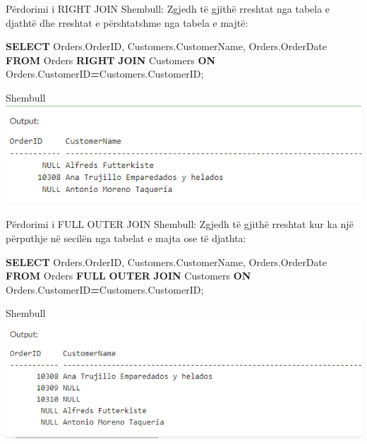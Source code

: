 \documentclass[
  ignorenonframetext,
]{beamer}
\newenvironment{Shaded}{\begin{snugshade}}{\end{snugshade}}
\newcommand{\KeywordTok}[1]{\textcolor[rgb]{0.13,0.29,0.53}{\textbf{#1}}}
\newcommand{\NormalTok}[1]{#1}
\newcommand{\OperatorTok}[1]{\textcolor[rgb]{0.81,0.36,0.00}{\textbf{#1}}}
\begin{document}
\begin{frame}[fragile]{Përdorimi i RIGHT JOIN}
\label{puxebrdorimi-i-right-join}
Shembull: Zgjedh të gjithë rreshtat nga tabela e djathtë dhe rreshtat e
përshtatshme nga tabela e majtë:


\begin{Shaded}
\begin{Highlighting}[]
\KeywordTok{SELECT}\NormalTok{ Orders.OrderID, Customers.CustomerName, Orders.OrderDate}
\KeywordTok{FROM}\NormalTok{ Orders}
\KeywordTok{RIGHT} \KeywordTok{JOIN}\NormalTok{ Customers }\KeywordTok{ON}\NormalTok{ Orders.CustomerID}\OperatorTok{=}\NormalTok{Customers.CustomerID;}
\end{Highlighting}
\end{Shaded}
\end{frame}

\begin{frame}{Shembull}
\label{shembull-31}
\includegraphics{./Figs/query86.png}
\end{frame}

\begin{frame}[fragile]{Përdorimi i FULL OUTER JOIN}
\label{puxebrdorimi-i-full-outer-join}
Shembull: Zgjedh të gjithë rreshtat kur ka një përputhje në secilën nga
tabelat e majta ose të djathta:


\begin{Shaded}
\begin{Highlighting}[]
\KeywordTok{SELECT}\NormalTok{ Orders.OrderID, Customers.CustomerName, Orders.OrderDate}
\KeywordTok{FROM}\NormalTok{ Orders}
\KeywordTok{FULL} \KeywordTok{OUTER} \KeywordTok{JOIN}\NormalTok{ Customers }\KeywordTok{ON}\NormalTok{ Orders.CustomerID}\OperatorTok{=}\NormalTok{Customers.CustomerID;}
\end{Highlighting}
\end{Shaded}
\end{frame}

\begin{frame}{Shembull}
\label{shembull-32}
\includegraphics{./Figs/query87.png}
\end{frame}
\end{document}
